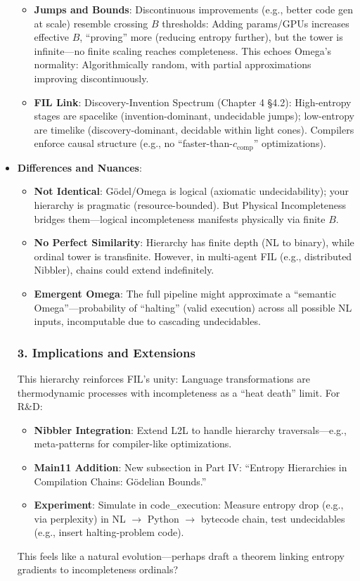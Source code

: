 \documentclass[11pt,letterpaper]{article}
\begin{document}
\begin{itemize}
\begin{itemize}
        \item \textbf{Jumps and Bounds}: Discontinuous improvements (e.g., better code gen at scale) resemble crossing $B$ thresholds: Adding params/GPUs increases effective $B$, “proving” more (reducing entropy further), but the tower is infinite—no finite scaling reaches completeness. This echoes Omega’s normality: Algorithmically random, with partial approximations improving discontinuously.
        \item \textbf{FIL Link}: Discovery-Invention Spectrum (Chapter 4 §4.2): High-entropy stages are spacelike (invention-dominant, undecidable jumps); low-entropy are timelike (discovery-dominant, decidable within light cones). Compilers enforce causal structure (e.g., no “faster-than-$c_{\text{comp}}$” optimizations).
    \end{itemize}
    \item \textbf{Differences and Nuances}:
    \begin{itemize}
        \item \textbf{Not Identical}: Gödel/Omega is logical (axiomatic undecidability); your hierarchy is pragmatic (resource-bounded). But Physical Incompleteness bridges them—logical incompleteness manifests physically via finite $B$.
        \item \textbf{No Perfect Similarity}: Hierarchy has finite depth (NL to binary), while ordinal tower is transfinite. However, in multi-agent FIL (e.g., distributed Nibbler), chains could extend indefinitely.
        \item \textbf{Emergent Omega}: The full pipeline might approximate a “semantic Omega”—probability of “halting” (valid execution) across all possible NL inputs, incomputable due to cascading undecidables.
    \end{itemize}

\subsubsection*{3. Implications and Extensions}
This hierarchy reinforces FIL’s unity: Language transformations are thermodynamic processes with incompleteness as a “heat death” limit. For R\&D:
\begin{itemize}
    \item \textbf{Nibbler Integration}: Extend L2L to handle hierarchy traversals—e.g., meta-patterns for compiler-like optimizations.
    \item \textbf{Main11 Addition}: New subsection in Part IV: “Entropy Hierarchies in Compilation Chains: Gödelian Bounds.”
    \item \textbf{Experiment}: Simulate in code\_execution: Measure entropy drop (e.g., via perplexity) in NL $\to$ Python $\to$ bytecode chain, test undecidables (e.g., insert halting-problem code).
\end{itemize}
This feels like a natural evolution—perhaps draft a theorem linking entropy gradients to incompleteness ordinals?


\end{itemize}
\end{document}
